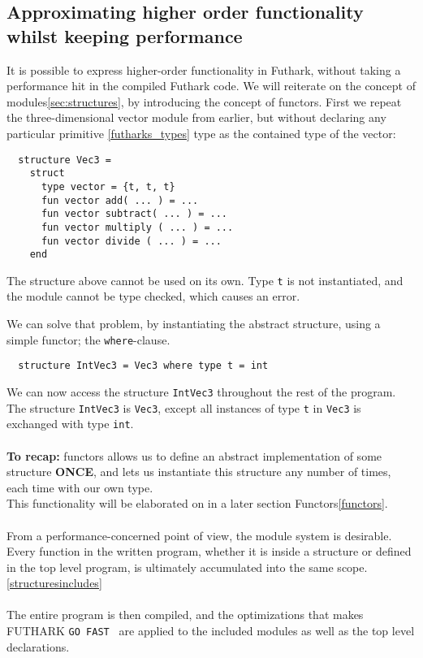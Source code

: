 \subsection{Approximating higher order functionality whilst keeping performance}
\label{subsec:higherorderfunctionality}
It is possible to express higher-order functionality in Futhark, without taking
a performance hit in the compiled Futhark code.
We will reiterate on the concept of modules\ref{sec:structures}, by introducing
the concept of functors.
First we repeat the three-dimensional vector module
from earlier, but without declaring any particular
primitive \ref{futharks_types} type as the contained type of the vector:
\begin{verbatim}
  structure Vec3 = 
    struct
      type vector = {t, t, t}
      fun vector add( ... ) = ...
      fun vector subtract( ... ) = ...
      fun vector multiply ( ... ) = ...
      fun vector divide ( ... ) = ...
    end
\end{verbatim}
\noindent
The structure above cannot be used on its own. Type \texttt{t} is not
instantiated, and the module cannot be type checked, which causes an error.

\noindent
We can solve that problem, by instantiating the abstract structure, using a
simple functor; the \texttt{where}-clause.
\begin{verbatim}
  structure IntVec3 = Vec3 where type t = int
\end{verbatim}
\noindent
We can now access the structure \texttt{IntVec3} throughout the rest of the
program.
\\
The structure \texttt{IntVec3} is \texttt{Vec3}, except all instances
of type \texttt{t} in \texttt{Vec3} is exchanged with type \texttt{int}.
\\
\\
\textbf{To recap:} functors allows us to define an abstract implementation of some
structure \textbf{ONCE}, and lets us instantiate this structure any number of
times, each time with our own type.
\\
This functionality will be elaborated on in a later section Functors\ref{functors}. 
\\
\\
From a performance-concerned point of view, the module system is desirable.
Every function in the written program, whether it is inside a structure
or defined in the top level program, is ultimately accumulated into the same
scope. \ref{structuresincludes}
\\
\\
The entire program is then compiled, and the optimizations that makes FUTHARK \texttt{GO
FAST } are applied to the included modules as well as the top level declarations.

